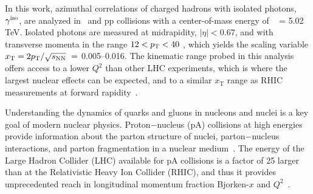 In this work, azimuthal correlations of charged hadrons with isolated photons, $\gamma^\mathrm{iso}$, are analyzed in \pPb~and pp collisions with a center-of-mass energy of \sqrtsNN~ = 5.02 TeV. Isolated photons are measured at midrapidity, {$|\eta|<0.67$}, and with transverse momenta in the range $12 <p_{\mathrm{T}}<40$ \GeVc, which yields the scaling variable {$x_{\mathrm{T}} = 2\pt/\sqrt{s_{\mathrm{NN}}}\ = $ 0.005--0.016}. The kinematic range probed in this analysis offers access to a lower $Q^{2}$ than other LHC experiments, which is where the largest nuclear effects can be expected,  and to a similar $x_{\mathrm{T}}$ range as RHIC measurements at forward rapidity~\cite{Adare:2011sc}. 

Understanding the dynamics of quarks and gluons in nucleons and nuclei is a key goal of modern nuclear physics. Proton$-$nucleus (pA) collisions at high energies provide information about the parton structure of nuclei, parton$-$nucleus interactions, and parton fragmentation in a nuclear medium~\cite{Accardi:2009qv}. The energy of the Large Hadron Collider (LHC) available for pA collisions is a factor of 25 larger than at the Relativistic Heavy Ion Collider (RHIC), and thus it provides unprecedented reach in longitudinal momentum fraction Bjorken-$x$ and $Q^{2}$~\cite{Salgado:2011wc}. 

